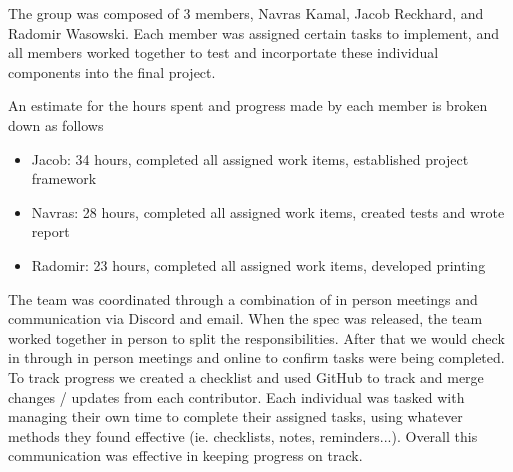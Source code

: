 The group was composed of 3 members, Navras Kamal, Jacob Reckhard, and
Radomir Wasowski.  Each member was assigned certain tasks to implement, and
all members worked together to test and incorportate these individual
components into the final project.

An estimate for the hours spent and progress made by each member is broken down as follows
\begin{itemize}
\item{Jacob: 34 hours, completed all assigned work items, established project framework}
\item{Navras: 28 hours, completed all assigned work items, created tests and wrote report}
\item{Radomir: 23 hours, completed all assigned work items, developed printing}
\end{itemize}

The team was coordinated through a combination of in person meetings and
communication via Discord and email.  When the spec was released, the team
worked together in person to split the responsibilities.  After that we would
check in through in person meetings and online to confirm tasks were being
completed.  To track progress we created a checklist and used GitHub to track
and merge changes / updates from each contributor.  Each individual was tasked
with managing their own time to complete their assigned tasks, using whatever
methods they found effective (ie. checklists, notes, reminders...).  Overall
this communication was effective in keeping progress on track.
